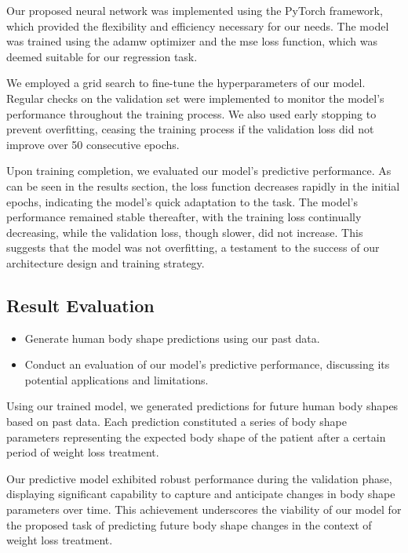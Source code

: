 Our proposed neural network was implemented using the PyTorch framework, which
provided the flexibility and efficiency necessary for our needs. The model was
trained using the \gls{adamw} optimizer and the \gls{mse} loss function, which
was deemed suitable for our regression task.

We employed a grid search to fine-tune the hyperparameters of our model.
Regular checks on the validation set were implemented to monitor the model's
performance throughout the training process. We also used early stopping to
prevent overfitting, ceasing the training process if the validation loss did
not improve over 50 consecutive epochs.

Upon training completion, we evaluated our model's predictive performance. As
can be seen in the results section, the loss function decreases rapidly in the
initial epochs, indicating the model's quick adaptation to the task. The
model's performance remained stable thereafter, with the training loss
continually decreasing, while the validation loss, though slower, did not
increase. This suggests that the model was not overfitting, a testament to the
success of our architecture design and training strategy.

\subsection{Result Evaluation}

\begin{itemize}
      \item Generate human body shape predictions using our past data.
      \item Conduct an evaluation of our model's predictive performance, discussing its
            potential applications and limitations.
\end{itemize}

Using our trained model, we generated predictions for future human body shapes
based on past data. Each prediction constituted a series of body shape
parameters representing the expected body shape of the patient after a certain
period of weight loss treatment.

Our predictive model exhibited robust performance during the validation phase,
displaying significant capability to capture and anticipate changes in body
shape parameters over time. This achievement underscores the viability of our
model for the proposed task of predicting future body shape changes in the
context of weight loss treatment.

